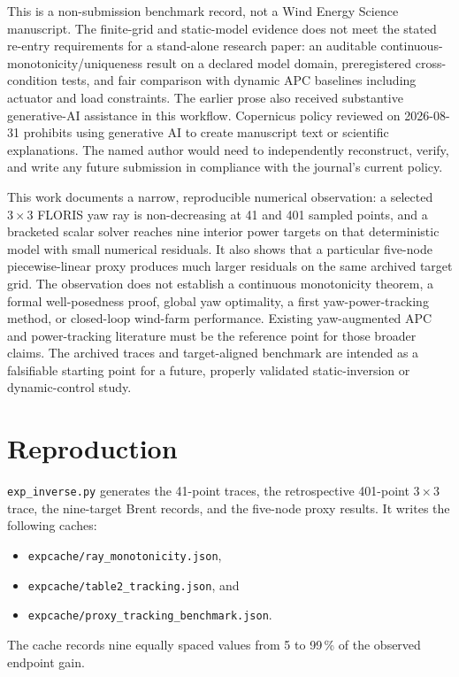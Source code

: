 \documentclass[wes, manuscript]{copernicus}
\begin{document}
This is a non-submission benchmark record, not a Wind Energy Science manuscript. The finite-grid and static-model evidence does not meet the stated re-entry requirements for a stand-alone research paper: an auditable continuous-monotonicity/uniqueness result on a declared model domain, preregistered cross-condition tests, and fair comparison with dynamic APC baselines including actuator and load constraints. The earlier prose also received substantive generative-AI assistance in this workflow. Copernicus policy reviewed on 2026-08-31 prohibits using generative AI to create manuscript text or scientific explanations. The named author would need to independently reconstruct, verify, and write any future submission in compliance with the journal's current policy.

\conclusions
\label{sec:conclusions}

This work documents a narrow, reproducible numerical observation: a selected $3\times3$ FLORIS yaw ray is non-decreasing at 41 and 401 sampled points, and a bracketed scalar solver reaches nine interior power targets on that deterministic model with small numerical residuals. It also shows that a particular five-node piecewise-linear proxy produces much larger residuals on the same archived target grid. The observation does not establish a continuous monotonicity theorem, a formal well-posedness proof, global yaw optimality, a first yaw-power-tracking method, or closed-loop wind-farm performance. Existing yaw-augmented APC and power-tracking literature must be the reference point for those broader claims. The archived traces and target-aligned benchmark are intended as a falsifiable starting point for a future, properly validated static-inversion or dynamic-control study.


\appendix
\section{Reproduction}
\label{app:repro}

\texttt{exp\_inverse.py} generates the 41-point traces, the retrospective 401-point $3\times3$ trace, the nine-target Brent records, and the five-node proxy results. It writes the following caches:
\begin{itemize}
\item \texttt{expcache/ray\_monotonicity.json},
\item \texttt{expcache/table2\_tracking.json}, and
\item \texttt{expcache/proxy\_tracking\_benchmark.json}.
\end{itemize}
The cache records nine equally spaced values from 5 to 99\,\% of the observed endpoint gain.
\end{document}
